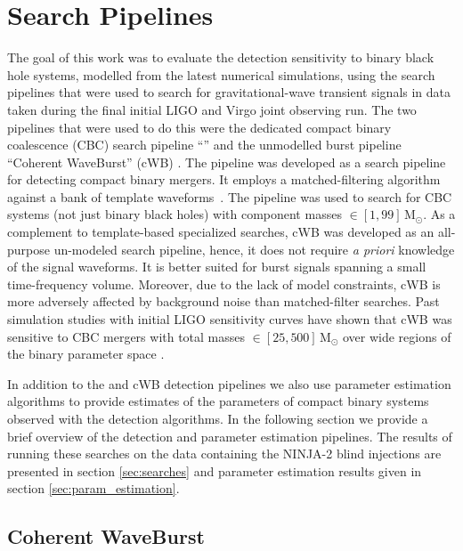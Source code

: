 \section{Search Pipelines}
\label{sec:pipelines}

The goal of this work was to evaluate the detection sensitivity to
binary black hole systems, modelled from the latest numerical
simulations, using the search pipelines that were used to search for
gravitational-wave transient signals in data taken during the final
initial LIGO and Virgo joint observing run.  The two pipelines that
were used to do this were the dedicated compact binary coalescence
(CBC) search pipeline ``\ihope{}'' \cite{Abbott:2009tt, Abbott:2009qj,
Abadie:2011kd, Colaboration:2011np, Aasi:2012rja, Babak:2012zx}
and the unmodelled burst pipeline ``Coherent WaveBurst'' (cWB)
\cite{Abbott:2007wu, Abadie:2010mt, Abadie:2012rq, Virgo:2012aa}. The
\ihope{} pipeline was developed as a search pipeline for detecting
compact binary mergers. It employs a matched-filtering algorithm
against a bank of template waveforms~\cite{Babak:2012zx}. The \ihope{}
pipeline was used to search for CBC systems (not just binary black
holes) with component masses $\in [1,99]\, \mathrm{M}_{\odot}$.  As a
complement to template-based specialized searches, cWB was developed
as an all-purpose un-modeled search pipeline, hence, it does not
require \emph{a priori} knowledge of the signal waveforms. It is
better suited for burst signals spanning a small time-frequency
volume. Moreover, due to the lack of model constraints, cWB is more
adversely affected by background noise than matched-filter searches.
Past simulation studies with initial LIGO sensitivity curves have
shown that cWB was sensitive to CBC mergers with total masses $\in
[25,500]\, \mathrm{M}_{\odot}$ over wide regions of the binary
parameter space \cite{Pankow:2009nx}.

In addition to the \ihope{} and cWB detection pipelines we also use parameter 
estimation algorithms to provide estimates of the parameters of compact binary 
systems observed with the detection algorithms. 
In the following section we provide a brief overview of the detection and 
parameter estimation pipelines.
The results of running these searches on the data containing the NINJA-2 blind
injections are presented in section \ref{sec:searches} and parameter estimation 
results given in section \ref{sec:param_estimation}.

\subsection{Coherent WaveBurst}
\label{ssec:cwb_pipelines}

